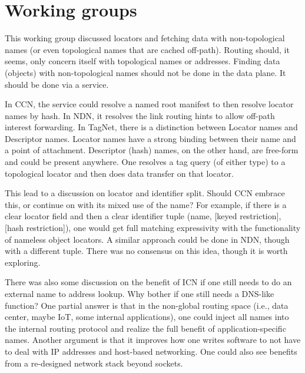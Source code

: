 \documentclass[a4paper,UKenglish]{dagrep}
\begin{document}
%



\section{Working groups}

\license

This working group discussed locators and fetching data with non-topological names (or even topological names that are cached off-path). Routing should, it seems, only concern itself with topological names or addresses.  Finding data (objects) with non-topological names should not be done in the data plane.  It should be done via a service.

In CCN, the service could resolve a named root manifest to then resolve locator names by hash.
In NDN, it resolves the link routing hints to allow off-path interest forwarding. In TagNet,
there is a distinction between Locator names and Descriptor names. Locator names have a
strong binding between their name and a point of attachment. Descriptor (hash) names, on the
other hand, are free-form and could be present anywhere.  One resolves a tag query (of either
type) to a topological locator and then does data transfer on that locator.

This lead to a discussion on locator and identifier split.  Should CCN embrace this, or continue on with its mixed use of the name? For example, if there is a clear locator field and then a clear identifier tuple (name, [keyed restriction], [hash restriction]), one would get full matching expressivity with the functionality of nameless object locators.  A similar approach could be done in NDN, though with a different tuple.  There was no consensus on this idea, though it is worth exploring.

There was also some discussion on the benefit of ICN if one still needs to do an external name to address lookup.  Why bother if one still needs a DNS-like function?  One partial answer is that in the non-global routing space (i.e., data center, maybe IoT, some internal applications), one could inject all names into the internal routing protocol and realize the full benefit of application-specific names.  Another argument is that it improves how one writes software to not have to deal with IP addresses and host-based networking. One could also see benefits from a re-designed network stack beyond sockets.
\end{document}
